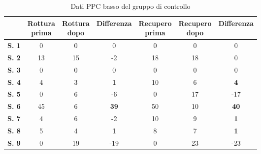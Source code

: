 \begin{table}[H]
\begin{center}
\begin{tabular}{|c|c|c|c|c|c|c|} \hline
{\textbf{}} & \pbox{20cm}{\textbf{Rottura} \\ \textbf{prima}} & \pbox{20cm}{\textbf{Rottura} \\ \textbf{dopo}} & \textbf{Differenza} & \pbox{20cm}{\textbf{Recupero} \\ \textbf{prima}} & \pbox{20cm}{\textbf{Recupero} \\ \textbf{dopo}} & \textbf{Differenza} \\ \hline
\textbf{S. 1} & 0 & 0 & 0 & 0 & 0 & 0 \\ \hline
\textbf{S. 2} & 13 & 15 & -2 & 18 & 18 & 0 \\ \hline
\textbf{S. 3} & 0 & 0 & 0 & 0 & 0 & 0 \\ \hline
\textbf{S. 4} & 4 & 3 & \textbf{1} & 10 & 6 & \textbf{4} \\ \hline
\textbf{S. 5} & 0 & 6 & -6 & 0 & 17 & -17 \\ \hline
\textbf{S. 6} & 45 & 6 & \textbf{39} & 50 & 10 & \textbf{40}  \\ \hline
\textbf{S. 7} & 4 & 6 & -2 & 10 & 9 & \textbf{1} \\ \hline
\textbf{S. 8} & 5 & 4 & \textbf{1} & 8 & 7 & \textbf{1} \\ \hline
\textbf{S. 9} & 0 & 19 & -19 & 0 & 23 & -23 \\ \hline
\end{tabular}
\end{center}
\caption{Dati PPC basso del gruppo di controllo}
\end{table}

\\\ \\\  

